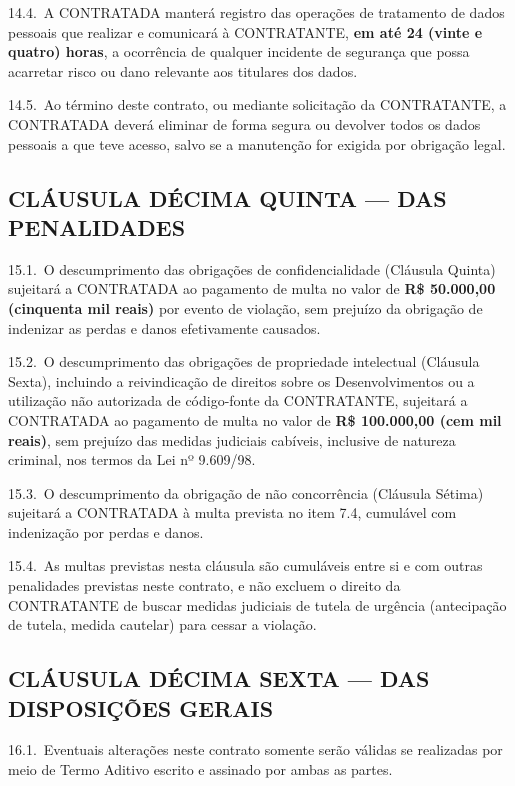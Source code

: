 \documentclass[11pt, a4paper]{article}
\begin{document}
14.4.\ A CONTRATADA manterá registro das operações de tratamento de dados pessoais que realizar e comunicará à CONTRATANTE, \textbf{em até 24 (vinte e quatro) horas}, a ocorrência de qualquer incidente de segurança que possa acarretar risco ou dano relevante aos titulares dos dados.

14.5.\ Ao término deste contrato, ou mediante solicitação da CONTRATANTE, a CONTRATADA deverá eliminar de forma segura ou devolver todos os dados pessoais a que teve acesso, salvo se a manutenção for exigida por obrigação legal.

\subsection{CLÁUSULA DÉCIMA QUINTA — DAS PENALIDADES}

15.1.\ O descumprimento das obrigações de confidencialidade (Cláusula Quinta) sujeitará a CONTRATADA ao pagamento de multa no valor de \textbf{R\$ 50.000,00 (cinquenta mil reais)} por evento de violação, sem prejuízo da obrigação de indenizar as perdas e danos efetivamente causados.

15.2.\ O descumprimento das obrigações de propriedade intelectual (Cláusula Sexta), incluindo a reivindicação de direitos sobre os Desenvolvimentos ou a utilização não autorizada de código-fonte da CONTRATANTE, sujeitará a CONTRATADA ao pagamento de multa no valor de \textbf{R\$ 100.000,00 (cem mil reais)}, sem prejuízo das medidas judiciais cabíveis, inclusive de natureza criminal, nos termos da Lei nº 9.609/98.

15.3.\ O descumprimento da obrigação de não concorrência (Cláusula Sétima) sujeitará a CONTRATADA à multa prevista no item 7.4, cumulável com indenização por perdas e danos.

15.4.\ As multas previstas nesta cláusula são cumuláveis entre si e com outras penalidades previstas neste contrato, e não excluem o direito da CONTRATANTE de buscar medidas judiciais de tutela de urgência (antecipação de tutela, medida cautelar) para cessar a violação.

\subsection{CLÁUSULA DÉCIMA SEXTA — DAS DISPOSIÇÕES GERAIS}

16.1.\ Eventuais alterações neste contrato somente serão válidas se realizadas por meio de Termo Aditivo escrito e assinado por ambas as partes.
\end{document}
